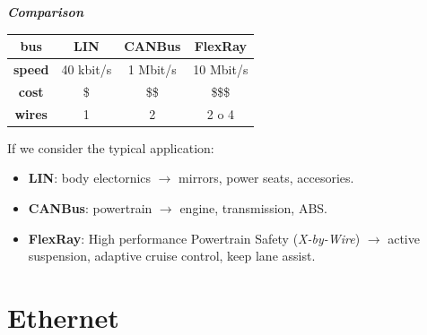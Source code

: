 \textbf{\textit{Comparison}} 
\begin{center}
    \begin{tabular}{ | c | c | c | c | } \hline
        \textbf{bus} & LIN & CANBus & FlexRay \\ \hline
        \textbf{speed} & 40 kbit/s & 1 Mbit/s & 10 Mbit/s \\ \hline
        \textbf{cost} & \$ & \$\$ & \$\$\$ \\ \hline
        \textbf{wires} & 1 & 2 & 2 o 4 \\ \hline
    \end{tabular}
\end{center}
If we consider the typical application:
\begin{itemize}[nosep]
    \item \textbf{LIN}: body electornics $\rightarrow$ mirrors, power seats, accesories.
    \item \textbf{CANBus}: powertrain $\rightarrow$ engine, transmission, ABS.
    \item \textbf{FlexRay}: High performance Powertrain Safety (\textit{X-by-Wire}) $\rightarrow$ active suspension, adaptive cruise control, keep lane assist.
\end{itemize}

\newpage
\section{Ethernet}


